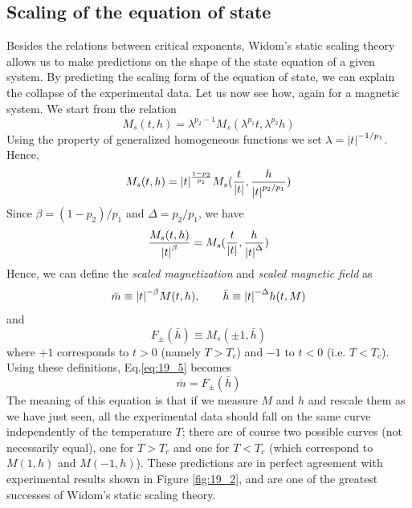 \documentclass[../../Main/Main.tex]{subfiles}
\begin{document}
\subsection{Scaling of the equation of state}
Besides the relations between critical exponents, Widom's static scaling theory allows us to make predictions on the shape of the state equation of a given system.
By predicting the scaling form of the equation of state, we can explain the collapse of the experimental data. Let us now see how, again for a magnetic system. We start from the relation
\begin{equation*}
  M_s (t,h) = \lambda ^{p_2 - 1} M_s (\lambda ^{p_1} t, \lambda ^{p_2} h)
\end{equation*}
Using the property of generalized homogeneous functions we set \( \lambda = \abs{t}^{-1/p_1}  \). Hence,
\begin{equation*}
  M_s (t,h) = \abs{t}^{\frac{1-p_2}{p_1}} M_s ( \frac{t}{\abs{t} }, \frac{h}{\abs{t}^{p_2/p_1 } })
\end{equation*}
Since \( \beta = (1-p_2)/p_1 \) and \( \Delta = p_2/p_1 \), we have
\begin{equation}
  \frac{M_s (t,h)}{\abs{t}^{\beta } } = M_s ( \frac{t}{\abs{t} }, \frac{h}{\abs{t}^{\Delta } })
  \label{eq:19_5}
\end{equation}
Hence, we can define the \emph{scaled magnetization} and \emph{scaled magnetic field}  as
\begin{equation}
    \bar{m} \equiv \abs{t}^{-\beta } M(t,h), \qquad \bar{h} \equiv \abs{t}^{-\Delta } h (t,M)
\end{equation}
and
\begin{equation}
  F_{\pm} ( \bar{h} ) \equiv M_s (\pm1, \bar{h} )
\end{equation}
where \( +1 \)  corresponds to \( t>0 \)  (namely \( T>T_c \)) and \( -1 \)  to \( t<0 \)  (i.e. \( T<T_c \)).
Using these definitions, Eq.\eqref{eq:19_5} becomes
\begin{equation}
  \bar{m} = F_{\pm} (\bar{h} )
\end{equation}
The meaning of this equation is that if we measure \( M \) and \( h \) and rescale them as we have just seen, all the experimental data should fall on the same curve independently of the temperature \( T \); there are of course two possible curves (not necessarily equal), one for \( T>T_c \)  and one for \( T<T_c \)  (which correspond to \( M(1,h) \) and \( M(-1,h) \)). These predictions are in perfect agreement with experimental results shown in Figure \ref{fig:19_2}, and are one of the greatest successes of Widom's static scaling theory.
\end{document}
